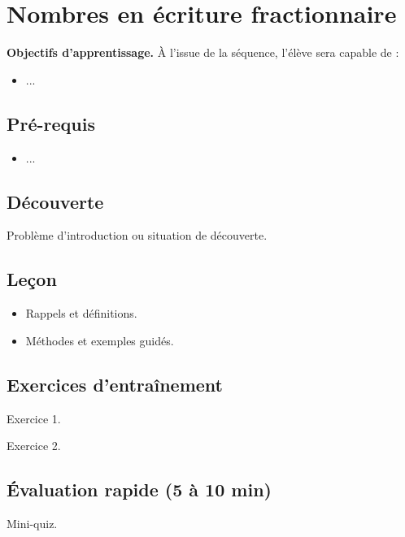\chapter{Nombres en écriture fractionnaire}
\label{chap:seq15}

\begin{definitionbox}
\textbf{Objectifs d'apprentissage.} À l'issue de la séquence, l'élève sera capable de :
\begin{itemize}
  \item ...
\end{itemize}
\end{definitionbox}

\section*{Pré-requis}
\begin{itemize}
  \item ...
\end{itemize}

\section{Découverte}
\begin{examplebox}
Problème d'introduction ou situation de découverte.
\end{examplebox}

\section{Leçon}
\begin{itemize}
  \item Rappels et définitions.
  \item Méthodes et exemples guidés.
\end{itemize}

\section{Exercices d'entraînement}
\begin{exercisebox}
Exercice 1.
\end{exercisebox}

\begin{exercisebox}
Exercice 2.
\end{exercisebox}

\section{Évaluation rapide (5 à 10 min)}
\begin{exercisebox}
Mini-quiz.
\end{exercisebox}
